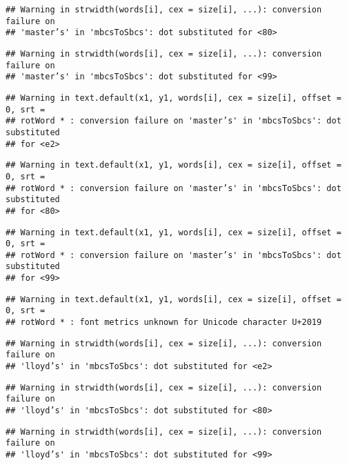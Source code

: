 \documentclass[
]{article}
\begin{document}
\begin{verbatim}
## Warning in strwidth(words[i], cex = size[i], ...): conversion failure on
## 'master’s' in 'mbcsToSbcs': dot substituted for <80>
\end{verbatim}

\begin{verbatim}
## Warning in strwidth(words[i], cex = size[i], ...): conversion failure on
## 'master’s' in 'mbcsToSbcs': dot substituted for <99>
\end{verbatim}

\begin{verbatim}
## Warning in text.default(x1, y1, words[i], cex = size[i], offset = 0, srt =
## rotWord * : conversion failure on 'master’s' in 'mbcsToSbcs': dot substituted
## for <e2>
\end{verbatim}

\begin{verbatim}
## Warning in text.default(x1, y1, words[i], cex = size[i], offset = 0, srt =
## rotWord * : conversion failure on 'master’s' in 'mbcsToSbcs': dot substituted
## for <80>
\end{verbatim}

\begin{verbatim}
## Warning in text.default(x1, y1, words[i], cex = size[i], offset = 0, srt =
## rotWord * : conversion failure on 'master’s' in 'mbcsToSbcs': dot substituted
## for <99>
\end{verbatim}

\begin{verbatim}
## Warning in text.default(x1, y1, words[i], cex = size[i], offset = 0, srt =
## rotWord * : font metrics unknown for Unicode character U+2019
\end{verbatim}

\begin{verbatim}
## Warning in strwidth(words[i], cex = size[i], ...): conversion failure on
## 'lloyd’s' in 'mbcsToSbcs': dot substituted for <e2>
\end{verbatim}

\begin{verbatim}
## Warning in strwidth(words[i], cex = size[i], ...): conversion failure on
## 'lloyd’s' in 'mbcsToSbcs': dot substituted for <80>
\end{verbatim}

\begin{verbatim}
## Warning in strwidth(words[i], cex = size[i], ...): conversion failure on
## 'lloyd’s' in 'mbcsToSbcs': dot substituted for <99>
\end{verbatim}
\end{document}
